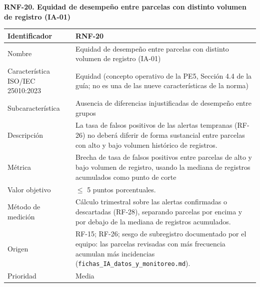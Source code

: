 \documentclass[12pt,a4paper]{article}
\begin{document}
\begin{minipage}{\linewidth}
\bigskip
\noindent\textbf{RNF-20. Equidad de desempeño entre parcelas con distinto volumen de registro (IA-01)}
\label{tab:RNF-20}

\begin{center}
\begin{tabular}{|p{4.2cm}|p{10cm}|}
\hline
Identificador & RNF-20 \\
\hline
Nombre & Equidad de desempeño entre parcelas con distinto volumen de registro (IA-01) \\
\hline
Característica ISO/IEC 25010:2023 & Equidad (concepto operativo de la PE5, Sección 4.4 de la guía; no es una de las nueve características de la norma) \\
\hline
Subcaracterística & Ausencia de diferencias injustificadas de desempeño entre grupos \\
\hline
Descripción & La tasa de falsos positivos de las alertas tempranas (RF-26) no deberá diferir de forma sustancial entre parcelas con alto y bajo volumen histórico de registros. \\
\hline
Métrica & Brecha de tasa de falsos positivos entre parcelas de alto y bajo volumen de registro, usando la mediana de registros acumulados como punto de corte \\
\hline
Valor objetivo & $\leq$ 5 puntos porcentuales. \\
\hline
Método de medición & Cálculo trimestral sobre las alertas confirmadas o descartadas (RF-28), separando parcelas por encima y por debajo de la mediana de registros acumulados. \\
\hline
Origen & RF-15; RF-26; sesgo de subregistro documentado por el equipo: las parcelas revisadas con más frecuencia acumulan más incidencias (\texttt{fichas\_IA\_datos\_y\_monitoreo.md}). \\
\hline
Prioridad & Media \\
\hline
\end{tabular}
\end{center}
\end{minipage}
\end{document}
